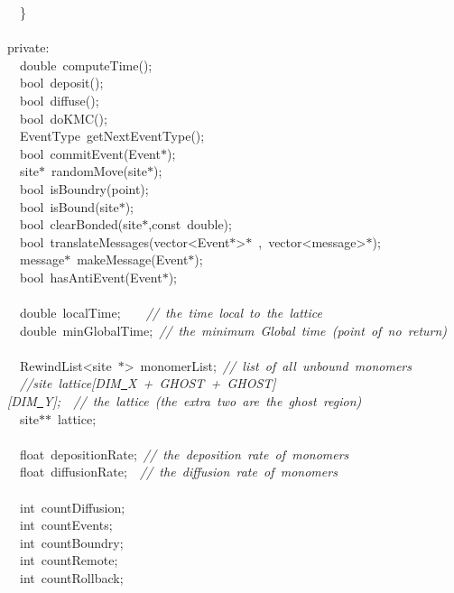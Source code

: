 {\ \ \}\\
\ \\
private:\\
\ \ double\ computeTime();\\
\ \ bool\ deposit();\\
\ \ bool\ diffuse();\\
\ \ bool\ doKMC();\\
\ \ EventType\ getNextEventType();\\
\ \ bool\ commitEvent(Event$\ast$);\\
\ \ site$\ast$\ randomMove(site$\ast$);\\
\ \ bool\ isBoundry(point);\\
\ \ bool\ isBound(site$\ast$);\\
\ \ bool\ clearBonded(site$\ast$,const\ double);\\
\ \ bool\ translateMessages(vector<{}Event$\ast$>{}$\ast$\ ,\ vector<{}message>{}$\ast$);\\
\ \ message$\ast$\ makeMessage(Event$\ast$);\\
\ \ bool\ hasAntiEvent(Event$\ast$);\\
\ \\
\ \ double\ localTime;\ \ \ \ \textsl{//\ the\ time\ local\ to\ the\ lattice}\\
\ \ double\ minGlobalTime;\ \textsl{//\ the\ minimum\ Global\ time\ (point\ of\ no\ return)}\\
\ \\
\ \ RewindList<{}site\ $\ast$>{}\ monomerList;\ \textsl{//\ list\ of\ all\ unbound\ monomers}\\
\ \ \textsl{//site\ lattice[DIM\underline\ X\ +\ GHOST\ +\ GHOST][DIM\underline\ Y];\ \ //\ the\ lattice\ (the\ extra\ two\ are\ the\ ghost\ region)}\\
\ \ site$\ast$$\ast$\ lattice;\\
\ \\
\ \ float\ depositionRate;\ \textsl{//\ the\ deposition\ rate\ of\ monomers}\\
\ \ float\ diffusionRate;\ \ \textsl{//\ the\ diffusion\ rate\ of\ monomers}\\
\ \\
\ \ int\ countDiffusion;\\
\ \ int\ countEvents;\\
\ \ int\ countBoundry;\\
\ \ int\ countRemote;\\
\ \ int\ countRollback;\\
\ \\
$$}
